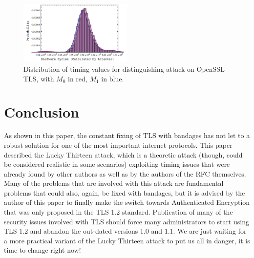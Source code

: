 \documentclass[10pt,conference,a4paper]{IEEEtran}
\begin{document}
\begin{figure}[h]
	\centering
	\includegraphics[width=0.5\textwidth]{afterfix.png}
	\caption{Distribution of timing values for distinguishing attack on OpenSSL TLS, with $M_0$ in red, $M_1$ in blue.~\cite{alfardan2013lucky}}
	\label{fig:afterfix}
\end{figure}




\section{Conclusion}
\label{sec:conclusion}
As shown in this paper, the constant fixing of TLS with bandages has not let to a robust solution for one of the most important internet protocols. This paper described the Lucky Thirteen attack, which is a theoretic attack (though, could be considered realistic in some scenarios) exploiting timing issues that were already found by other authors as well as by the authors of the RFC themselves. Many of the problems that are involved with this attack are fundamental problems that could also, again, be fixed with bandages, but it is advised by the author of this paper to finally make the switch towards Authenticated Encryption that was only proposed in the TLS 1.2 standard. Publication of many of the security issues involved with TLS should force many administrators to start using TLS 1.2 and abandon the out-dated versions 1.0 and 1.1. We are just waiting for a more practical variant of the Lucky Thirteen attack to put us all in danger, it is time to change right now!


%

\end{document}
